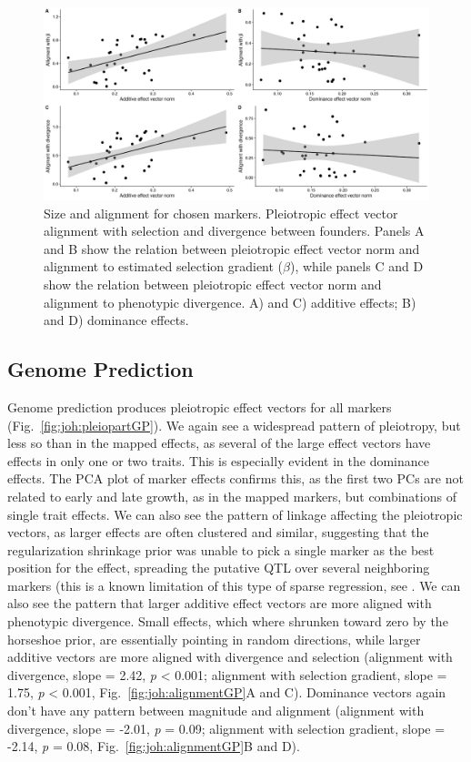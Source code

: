 \begin{refsection}
\begin{figure}
\includegraphics[width=\linewidth]{chapter_JoH-Melo_etal/media/growth_effect_aligment_regressions.png}
\caption[Size and alignment for chosen markers]{Size and alignment for chosen markers. Pleiotropic
effect vector alignment with selection and divergence between founders.
Panels A and B show the relation between pleiotropic effect vector norm and alignment
to estimated selection gradient ($\beta$), while panels C and D show the relation between
pleiotropic effect vector norm and alignment to phenotypic divergence. A)
and C) additive effects; B) and D) dominance effects.}
\label{fig:joh:alignment}
\end{figure}

\subsection{Genome Prediction}

Genome prediction produces pleiotropic effect vectors for all markers
(Fig.~\ref{fig:joh:pleiopartGP}). We again see a widespread pattern of pleiotropy, but less so
than in the mapped effects, as several of the large effect vectors have
effects in only one or two traits. This is especially evident in the
dominance effects. The PCA plot of marker effects confirms this, as the
first two PCs are not related to early and late growth, as in the mapped
markers, but combinations of single trait effects. We can also see the
pattern of linkage affecting the pleiotropic vectors, as larger effects
are often clustered and similar, suggesting that the regularization
shrinkage prior was unable to pick a single marker as the best position
for the effect, spreading the putative QTL over several neighboring
markers (this is a known limitation of this type of sparse regression,
see \textcite{Piironen2017-ih}. We can also see the pattern that larger additive effect vectors
are more aligned with phenotypic divergence. Small effects, which where
shrunken toward zero by the horseshoe prior, are essentially pointing in
random directions, while larger additive vectors are more aligned with
divergence and selection (alignment with divergence, slope = 2.42,
\emph{p} \textless{} 0.001; alignment with selection gradient, slope =
1.75, \emph{p} \textless{} 0.001, Fig.~\ref{fig:joh:alignmentGP}A and C). Dominance vectors
again don't have any pattern between magnitude and alignment (alignment
with divergence, slope = -2.01, \emph{p} = 0.09; alignment with
selection gradient, slope = -2.14, \emph{p} = 0.08, Fig.~\ref{fig:joh:alignmentGP}B and D).


\end{refsection}
